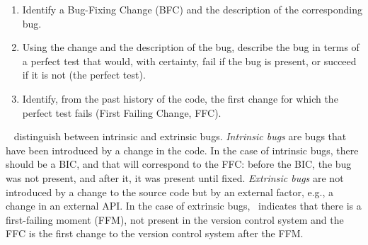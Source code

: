 \begin{enumerate}
    \item Identify a Bug-Fixing Change (BFC) and the description of the corresponding bug.
    \item Using the change and the description of the bug, describe the bug in terms of a perfect test that would, with certainty, fail if the bug is present, or succeed if it is not (the perfect test).
    \item Identify, from the past history of the code, the first change %
    for which the perfect test fails (First Failing Change, FFC).
\end{enumerate}

\gema~\cite{rodriguez2020bugs} distinguish between intrinsic and extrinsic bugs. 
\emph{Intrinsic bugs} are bugs that have been introduced by a change in the code.
In the case of intrinsic bugs, there should be a BIC, and that will correspond to the FFC: before the BIC, the bug was not present, and after it, it was present until fixed. 
\emph{Extrinsic bugs} are not introduced by a change to the source code but by an external factor, e.g., a change in an external API.
In the case of extrinsic bugs, \gema~indicates that there is a first-failing moment (FFM), not present in the version control system and the FFC is the first change to the version control system after the FFM.

